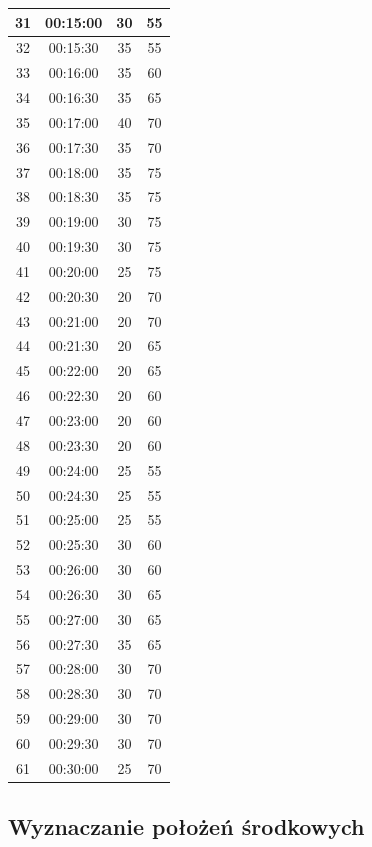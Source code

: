 \documentclass[a4paper,12pt]{article}
\begin{document}
\begin{longtable}{|c|c|c|c|}
31 & 00:15:00 & 30 & 55 \\ \hline
32 & 00:15:30 & 35 & 55 \\ \hline
33 & 00:16:00 & 35 & 60 \\ \hline
34 & 00:16:30 & 35 & 65 \\ \hline
35 & 00:17:00 & 40 & 70 \\ \hline
36 & 00:17:30 & 35 & 70 \\ \hline
37 & 00:18:00 & 35 & 75 \\ \hline
38 & 00:18:30 & 35 & 75 \\ \hline
39 & 00:19:00 & 30 & 75 \\ \hline
40 & 00:19:30 & 30 & 75 \\ \hline
41 & 00:20:00 & 25 & 75 \\ \hline
42 & 00:20:30 & 20 & 70 \\ \hline
43 & 00:21:00 & 20 & 70 \\ \hline
44 & 00:21:30 & 20 & 65 \\ \hline
45 & 00:22:00 & 20 & 65 \\ \hline
46 & 00:22:30 & 20 & 60 \\ \hline
47 & 00:23:00 & 20 & 60 \\ \hline
48 & 00:23:30 & 20 & 60 \\ \hline
49 & 00:24:00 & 25 & 55 \\ \hline
50 & 00:24:30 & 25 & 55 \\ \hline
51 & 00:25:00 & 25 & 55 \\ \hline
52 & 00:25:30 & 30 & 60 \\ \hline
53 & 00:26:00 & 30 & 60 \\ \hline
54 & 00:26:30 & 30 & 65 \\ \hline
55 & 00:27:00 & 30 & 65 \\ \hline
56 & 00:27:30 & 35 & 65 \\ \hline
57 & 00:28:00 & 30 & 70 \\ \hline
58 & 00:28:30 & 30 & 70 \\ \hline
59 & 00:29:00 & 30 & 70 \\ \hline
60 & 00:29:30 & 30 & 70 \\ \hline
61 & 00:30:00 & 25 & 70 \\ \hline
\end{longtable}

\renewcommand{\arraystretch}{1}

\subsection{Wyznaczanie położeń środkowych}
\end{document}
